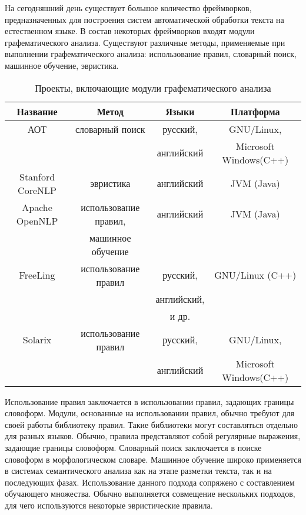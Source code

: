 На сегодняшний день существует большое количество фреймворков, предназначенных для построения систем автоматической обработки текста на естественном языке. В состав некоторых фреймворков входят модули графематического анализа. Существуют различные методы, применяемые при выполнении графематического анализа: использование правил, словарный поиск, машинное обучение, эвристика.
\begin{table}[H] \small
	\centering
	\label{t:thyp_gd1}
	\begin{tabular}{ | c | c | c | c |}
		\hline
		Название 							& Метод 				& Языки 		& Платформа 				\\ \hline
		АОТ\cite{web.aot}					& словарный поиск		& русский,		& GNU/Linux,			\\
											&						& английский	& Microsoft Windows(C++)\\ \hline
		Stanford CoreNLP\cite{web.corenlp}	& эвристика				& английский	& JVM (Java)			\\ \hline
		Apache OpenNLP\cite{web.opennlp}	& использование правил,	& английский	& JVM (Java)			\\
											& машинное обучение		& 				&						\\ \hline
		FreeLing\cite{web.freeling}			& использование правил	& русский,		& GNU/Linux (C++)		\\
											&						& английский,	&						\\
											&						& и др.			&						\\ \hline
		Solarix\cite{web.solarix}			& использование правил	& русский,		& GNU/Linux,			\\ 
											&						& английский	& Microsoft Windows(C++)\\
		\hline
	\end{tabular}
	\caption{Проекты, включающие модули графематического анализа}
\end{table}
Использование правил заключается в использовании правил, задающих границы словоформ. Модули, основанные на использовании правил, обычно требуют для своей работы библиотеку правил. Такие библиотеки могут составляться отдельно для разных языков. Обычно, правила представляют собой регулярные выражения, задающие границы словоформ. Словарный поиск заключается в поиске словоформ в морфологическом словаре. Машинное обучение широко применяется в системах семантического анализа как на этапе разметки текста, так и на последующих фазах. Использование данного подхода сопряжено с составлением обучающего множества. Обычно выполняется совмещение нескольких подходов, для чего используются некоторые эвристические правила.

